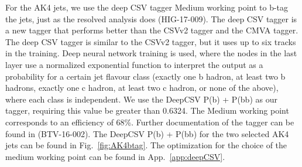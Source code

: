 For the AK4 jets, we use the deep CSV tagger Medium working point to b-tag the jets, just as the resolved analysis does (HIG-17-009). The deep CSV tagger is a new tagger that performs better than the CSVv2 tagger and the CMVA tagger. The deep CSV tagger is similar to the CSVv2 tagger, but it uses up to six tracks in the training. Deep neural network training is used, where the nodes in the last layer use a normalized exponential function to interpret the output as a probability for a certain jet flavour class (exactly one b hadron, at least two b hadrons, exactly one c hadron, at least two c hadron, or none of the above), where each class is independent. We use the DeepCSV P(b) + P(bb) as our tagger, requiring this value be greater than 0.6324. The Medium working point corresponds to an efficiency of 68\%. Further documentation of the tagger can be found in (BTV-16-002). The DeepCSV P(b) + P(bb) for the two selected AK4 jets can be found in Fig.~\ref{fig:AK4btag}. The optimization for the choice of the medium working point can be found in App.~\ref{app:deepCSV}.

